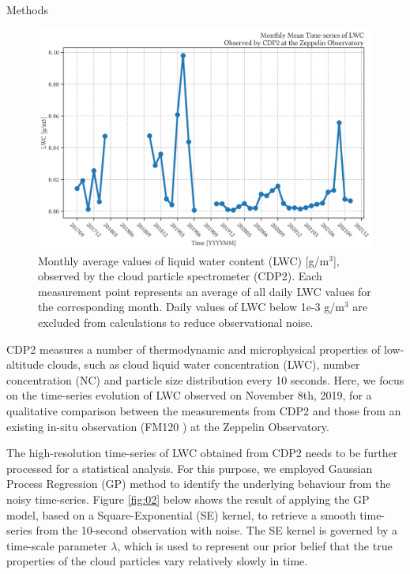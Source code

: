 \documentclass[final]{beamer}
\newlength{\colwidth}
\begin{document}
\begin{frame}[t]
\begin{columns}[t]
\begin{column}{\colwidth}
\begin{block}{Methods}
    \begin{figure}
        \centering
        \includegraphics[width=\colwidth]{img/monthly.png}
        \caption{ Monthly average values of liquid water content (LWC) [g/m$^3$], observed by the cloud particle spectrometer (CDP2). Each measurement point represents an average of all daily LWC values for the corresponding month. Daily values of LWC below 1e-3 g/m$^3$ are excluded from calculations to reduce observational noise. }
        \label{fig:01}
    \end{figure}

    CDP2 measures a number of thermodynamic and microphysical properties of low-altitude clouds, such as cloud liquid water concentration (LWC), number concentration (NC) and particle size distribution every 10 seconds. Here, we focus on the time-series evolution of LWC observed on November 8th, 2019, for a qualitative comparison between the measurements from CDP2 and those from an existing in-situ observation (FM120 \cite{karl2020ro,koik2019ye}) at the Zeppelin Observatory.

    The high-resolution time-series of LWC obtained from CDP2 needs to be further processed for a statistical analysis. For this purpose, we employed Gaussian Process Regression (GP) method \cite{rasm2006ga} to identify the underlying behaviour from the noisy time-series. Figure \ref{fig:02} below shows the result of applying the GP model, based on a Square-Exponential (SE) kernel, to retrieve a smooth time-series from the 10-second observation with noise. The SE kernel is governed by a time-scale parameter $\lambda$, which is used to represent our prior belief that the true properties of the cloud particles vary relatively slowly in time.


\end{block}
\end{column}
\end{columns}
\end{frame}
\end{document}

